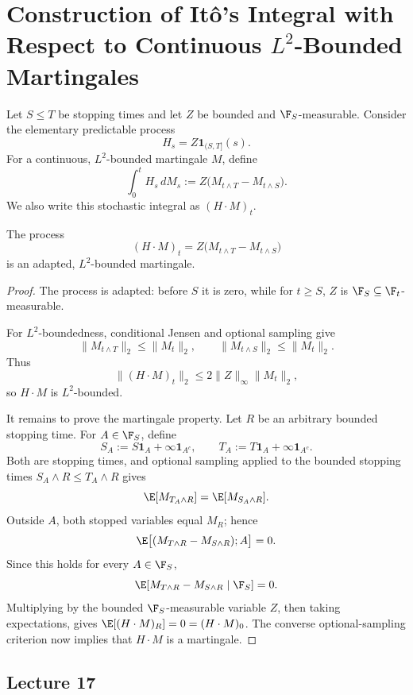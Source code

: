 \chapter{Construction of It\^o's Integral with Respect to Continuous \texorpdfstring{$L^2$}{L2}-Bounded Martingales}

Let \(S\leq T\) be stopping times and let \(Z\) be bounded and
\(\F_S\)-measurable. Consider the elementary predictable process
\[
    H_s=Z\mathbf 1_{(S,T]}(s).
\]
For a continuous, \(L^2\)-bounded martingale \(M\), define
\[
    \int_0^tH_s\,dM_s
    :=Z\bigl(M_{t\wedge T}-M_{t\wedge S}\bigr).
\]
We also write this stochastic integral as \((H\cdot M)_t\).

\begin{proposition}
The process
\[
    (H\cdot M)_t=Z\bigl(M_{t\wedge T}-M_{t\wedge S}\bigr)
\]
is an adapted, \(L^2\)-bounded martingale.
\end{proposition}

\begin{proof}
The process is adapted: before \(S\) it is zero, while for \(t\geq S\),
\(Z\) is \(\F_S\subseteq\F_t\)-measurable.

For \(L^2\)-boundedness, conditional Jensen and optional sampling give
\[
    \|M_{t\wedge T}\|_2\leq\|M_t\|_2,
    \qquad
    \|M_{t\wedge S}\|_2\leq\|M_t\|_2.
\]
Thus
\[
    \|(H\cdot M)_t\|_2
    \leq2\|Z\|_\infty\|M_t\|_2,
\]
so \(H\cdot M\) is \(L^2\)-bounded.

It remains to prove the martingale property. Let \(R\) be an arbitrary
bounded stopping time. For \(A\in\F_S\), define
\[
    S_A:=S\mathbf 1_A+\infty\mathbf 1_{A^c},
    \qquad
    T_A:=T\mathbf 1_A+\infty\mathbf 1_{A^c}.
\]
Both are stopping times, and optional sampling applied to the bounded
stopping times \(S_A\wedge R\leq T_A\wedge R\) gives
\[
    \E[M_{T_A\wedge R}]=\E[M_{S_A\wedge R}].
\]
Outside \(A\), both stopped variables equal \(M_R\); hence
\[
    \E\bigl[(M_{T\wedge R}-M_{S\wedge R});A\bigr]=0.
\]
Since this holds for every \(A\in\F_S\),
\[
    \E[M_{T\wedge R}-M_{S\wedge R}\mid\F_S]=0.
\]
Multiplying by the bounded \(\F_S\)-measurable variable \(Z\), then taking
expectations, gives \(\E[(H\cdot M)_R]=0=(H\cdot M)_0\). The converse
optional-sampling criterion now implies that \(H\cdot M\) is a martingale.
\end{proof}
\section{Lecture 17}

